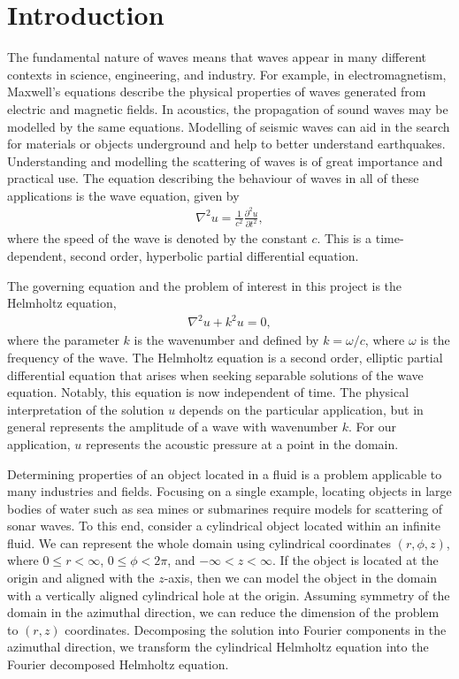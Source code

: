 \chapter{Introduction}


The fundamental nature of waves means that waves appear in many different contexts in science, engineering, and industry.
For example, in electromagnetism, Maxwell's equations describe the physical properties of waves generated from electric and magnetic fields.
In acoustics, the propagation of sound waves may be modelled by the same equations.
Modelling of seismic waves can aid in the search for materials or objects underground and help to better understand earthquakes.
Understanding and modelling the scattering of waves is of great importance and practical use.
The equation describing the behaviour of waves in all of these applications is the wave equation, given by
\begin{align}
	\nabla^2 u = \frac{1}{c^2}\frac{\partial^2 u}{\partial t^2}, \label{eqn:first}
\end{align}
where the speed of the wave is denoted by the constant $c$.
This is a time-dependent, second order, hyperbolic partial differential equation.

The governing equation and the problem of interest in this project is the Helmholtz equation,
\begin{align}
	\nabla^2 u + k^2 u = 0,
\end{align}
where the parameter $k$ is the wavenumber and defined by $k=\omega/c$, where $\omega$ is the frequency of the wave.
The Helmholtz equation is a second order, elliptic partial differential equation that arises when seeking separable solutions of the wave equation.
Notably, this equation is now independent of time.
The physical interpretation of the solution $u$ depends on the particular application, but in general represents the amplitude of a wave with wavenumber $k$.
For our application, $u$ represents the acoustic pressure at a point in the domain.

Determining properties of an object located in a fluid is a problem applicable to many industries and fields.
Focusing on a single example, locating objects in large bodies of water such as sea mines or submarines require models for scattering of sonar waves.
To this end, consider a cylindrical object located within an infinite fluid.
We can represent the whole domain using cylindrical coordinates $(r, \phi, z)$, where $0\leq r < \infty$, $0 \leq \phi < 2\pi$, and $-\infty < z < \infty$.
If the object is located at the origin and aligned with the $z$-axis, then we can model the object in the domain with a vertically aligned cylindrical hole at the origin.
Assuming symmetry of the domain in the azimuthal direction, we can reduce the dimension of the problem to $(r,z)$ coordinates.
Decomposing the solution into Fourier components in the azimuthal direction, we transform the cylindrical Helmholtz equation into the Fourier decomposed Helmholtz equation.


